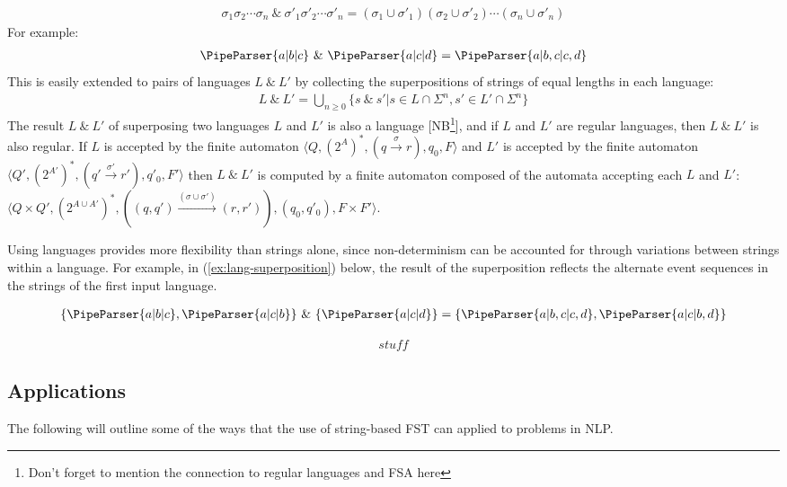 \documentclass[a4paper,12pt,leqno]{article}
\newcommand{\vph}[1]{\vphantom{#1}}
\newcommand{\sta}[2]{\stackrel{#1}{#2}}
\newcommand{\ebox}[1]{\fbox{$\vph{'(),}#1$}}
\renewcommand{\sp}{~\&~}
\newcommand{\EventString}[1]{
	\renewcommand*{\do}[1]{\ebox{##1}}%
	\PipeParser{#1}
}
\newcommand{\selfnote}[1]{{\color{red}[NB\footnote{{\color{red}#1}}]}}
\newcommand{\nb}{\selfnote}
\begin{document}
\begin{align}\label{def:superposition}
	\sigma_1\sigma_2\cdots\sigma_n \sp \sigma'_1\sigma'_2\cdots\sigma'_n = (\sigma_1 \cup \sigma'_1)(\sigma_2 \cup \sigma'_2)\cdots(\sigma_n \cup \sigma'_n)
\end{align}
For example:
\begin{align}\label{ex:superposition}
	\EventString{a|b|c} \sp{} \EventString{a|c|d} = \EventString{a|b,c|c,d}
\end{align}
This is easily extended to pairs of languages $L \sp L'$ by collecting the superpositions of strings of equal lengths in each language:
\begin{align}\label{def:lang-superposition}
	L \sp L' = \bigcup_{n \ge 0}\{ s \sp s' | s \in L \cap \Sigma^n, s' \in L' \cap \Sigma^n\}
\end{align}
The result $L \sp L'$ of superposing two languages $L$ and $L'$ is also a language \nb{Don't forget to mention the connection to regular languages and FSA here}, and if $L$ and $L'$ are regular languages, then $L \sp L'$ is also regular. If $L$ is accepted by the finite automaton $\langle Q, (2^A)^*, (q \sta{\sigma}{\to} r), q_0, F \rangle$ and $L'$ is accepted by the finite automaton $\langle Q', (2^{A'})^*, (q' \sta{\sigma'}{\to} r'), q'_0, F' \rangle$ then $L \sp L'$ is computed by a finite automaton composed of the automata accepting each $L$ and $L'$: $\langle Q \times Q', (2^{A \cup A'})^*, ((q, q') \sta{(\sigma \cup \sigma')}{\to} (r, r')), (q_0, q'_0), F \times F' \rangle$.

Using languages provides more flexibility than strings alone, since non-determinism can be accounted for through variations between strings within a language. For example, in (\ref{ex:lang-superposition}) below, the result of the superposition reflects the alternate event sequences in the strings of the first input language.

\begin{align}\label{ex:lang-superposition}
	\{\EventString{a|b|c}, \EventString{a|c|b}\} \sp \{\EventString{a|c|d}\} = \{\EventString{a|b,c|c,d}, \EventString{a|c|b,d}\}
\end{align}

\begin{align}\label{def:async-superposition}
	stuff
\end{align}

\subsection{Applications}\label{sub:applications}
The following will outline some of the ways that the use of string-based FST can applied to problems in NLP.
\end{document}
